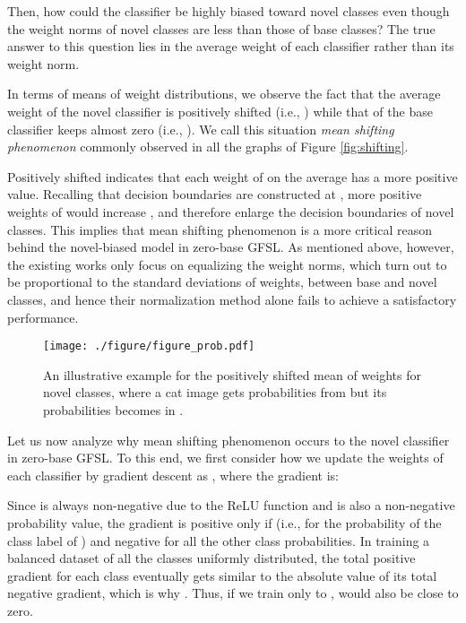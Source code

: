 Then, how could the classifier be highly biased toward novel classes even though the weight norms of novel classes are less than those of base classes? The true answer to this question lies in the average weight of each classifier rather than its weight norm.

In terms of means of weight distributions, we observe the fact that the average weight of the novel classifier is positively shifted (i.e., ) while that of the base classifier keeps almost zero (i.e., ). We call this situation \textit{mean shifting phenomenon} commonly observed in all the graphs of Figure \ref{fig:shifting}. 

Positively shifted  indicates that each weight of  on the average has a more positive value. Recalling that decision boundaries are constructed at , more positive weights of  would increase , and therefore enlarge the decision boundaries of novel classes. This implies that mean shifting phenomenon is a more critical reason behind the novel-biased model in zero-base GFSL. As mentioned above, however, the existing works \cite{HouPLWL19,KangXRYGFK20,ZhaoXGZX20} only focus on equalizing the weight norms, which turn out to be proportional to the standard deviations of weights, between base and novel classes, and hence their normalization method alone fails to achieve a satisfactory performance.


\begin{figure}[t!]
	\centering
    \texttt{[image: ./figure/figure\_prob.pdf]}
    \caption{An illustrative example for the positively shifted mean of weights for novel classes, where a cat image gets probabilities  from  but its probabilities becomes  in .}
    \label{fig:prob}\end{figure}



Let us now analyze why mean shifting phenomenon occurs to the novel classifier in zero-base GFSL. To this end, we first consider how we update the weights of each classifier by gradient descent as , where the gradient is:

Since  is always non-negative due to the ReLU function and  is also a non-negative probability value, the gradient is positive only if  (i.e., for the probability of the class label of ) and negative for all the other class probabilities. In training a balanced dataset of all the classes uniformly distributed, the total positive gradient for each class eventually gets similar to the absolute value of its total negative gradient, which is why . Thus, if we train  only to  ,  would also be close to zero. 


